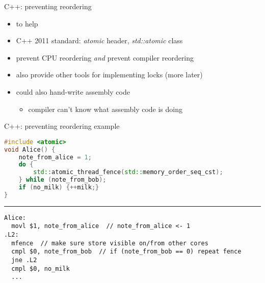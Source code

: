 

\begin{frame}{C++: preventing reordering}
    \begin{itemize}
        \item to help 
        \vspace{.5cm}
    \item C++ 2011 standard: \textit{atomic} header, \textit{std::atomic} class
        \item prevent CPU reordering \textit{and} prevent compiler reordering
        \item also provide other tools for implementing locks (more later)
            \vspace{.5cm}
        \item could also hand-write assembly code
            \begin{itemize}
                \item compiler can't know what assembly code is doing
            \end{itemize}
    \end{itemize}
\end{frame}

\begin{frame}[fragile,label=prevReorderCpp1]{C++: preventing reordering example}
\begin{lstlisting}[language=C++,style=smaller]
#include <atomic>
void Alice() {
    note_from_alice = 1;
    do {
        std::atomic_thread_fence(std::memory_order_seq_cst);
    } while (note_from_bob);
    if (no_milk) {++milk;}
}
\end{lstlisting}
\hrule
\begin{lstlisting}[language=myasm,style=smaller,morekeywords=mfence]
Alice:
  movl $1, note_from_alice  // note_from_alice <- 1
.L2:
  mfence  // make sure store visible on/from other cores
  cmpl $0, note_from_bob  // if (note_from_bob == 0) repeat fence
  jne .L2
  cmpl $0, no_milk
  ...
\end{lstlisting}
\end{frame}


